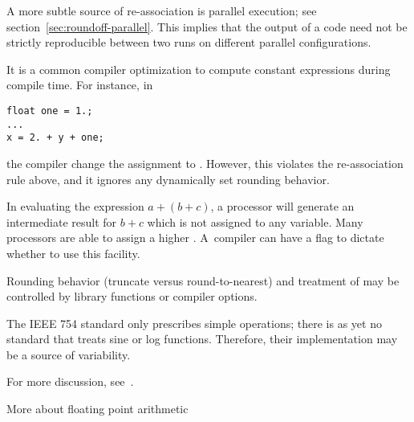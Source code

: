 A more subtle source of re-association is parallel execution; 
see section~\ref{sec:roundoff-parallel}. This implies that the output
of a code need not be strictly reproducible between two runs on
different parallel configurations.


%
It is a common compiler optimization to compute constant expressions
during compile time. For instance, in
\begin{lstlisting}
float one = 1.;
...
x = 2. + y + one;
\end{lstlisting}
the compiler change the assignment to . However, this
violates the re-association rule above, and it ignores any dynamically
set rounding behavior.

In evaluating the expression $a+(b+c)$, a processor will generate an 
intermediate result for $b+c$ which is not assigned to any variable.
Many processors are able to assign a higher 
.
A~compiler can have a flag to dictate whether to use this facility.

%
Rounding behavior (truncate versus round-to-nearest) and treatment of
 may be controlled by library
functions or compiler options.

The IEEE 754 standard only prescribes simple operations;
there is as yet no standard that treats sine or log functions.
Therefore, their implementation may be a source of variability.

For more discussion, see~\cite{Lionel:reproducibility}.


 {More about floating point arithmetic}




